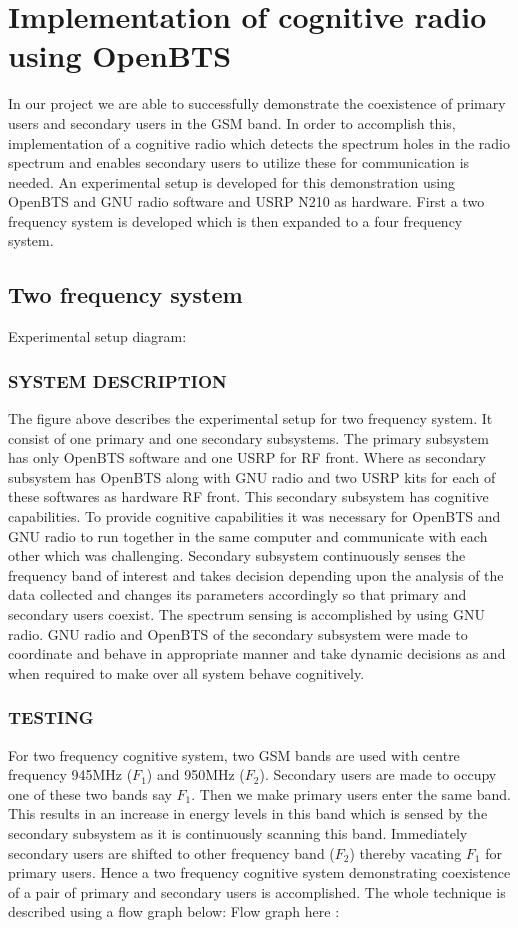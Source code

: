 \chapter{Implementation of cognitive radio using OpenBTS}

In our project we are able to successfully demonstrate the coexistence of 
primary users and secondary users in the GSM band. In order to accomplish this, 
implementation of a cognitive radio which detects the spectrum holes in the 
radio spectrum and enables secondary users to utilize these for communication 
is needed. An experimental setup is developed for this demonstration using 
OpenBTS and GNU radio software and USRP N210 as hardware. First a two frequency 
system is developed which is then expanded to a four frequency system.


\section{Two frequency system}

Experimental setup diagram:

\subsection{SYSTEM DESCRIPTION}
The figure above describes the experimental setup for two frequency system. It 
consist of one primary and one secondary subsystems. The primary subsystem has 
only OpenBTS software and one USRP for RF front. Where as secondary subsystem 
has OpenBTS along with GNU radio and two USRP kits for each of these softwares 
as hardware RF front. This secondary subsystem has cognitive capabilities. To 
provide cognitive capabilities it was necessary for OpenBTS and GNU radio to run 
together in the same computer and communicate with each other which was challenging. 
Secondary subsystem continuously senses the frequency band of interest and  
takes decision depending upon the analysis of the data collected and changes 
its parameters accordingly so that primary and secondary users coexist. The 
spectrum sensing is accomplished by using GNU radio.  GNU radio and 
OpenBTS of the secondary subsystem were made to coordinate and behave in appropriate manner and take dynamic decisions 
as and when required to make over all system behave cognitively.

\subsection{TESTING}
For two frequency cognitive system, two GSM bands are used with centre 
frequency 945MHz ($F_1$) and 950MHz ($F_2$). Secondary users are made to occupy 
one of these two bands say $F_1$. Then we make primary users enter the same 
band. This results in an increase in energy levels in this band which is sensed 
by the secondary subsystem as it is continuously scanning this band. 
Immediately secondary users are shifted to other frequency band ($F_2$) thereby 
vacating $F_1$ for primary users. Hence a two frequency cognitive system 
demonstrating coexistence of a pair of primary and secondary users is 
accomplished. 
The whole technique is described using a flow graph below:
Flow graph here :

